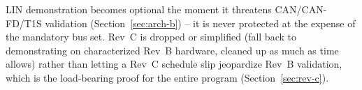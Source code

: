 \begin{decision}[title={LIN and Rev C are explicitly conditional}]
LIN demonstration becomes optional the moment it threatens CAN/CAN-FD/T1S validation (Section~\ref{sec:arch-b}) -- it is never protected at the expense of the mandatory bus set. Rev~C is dropped or simplified (fall back to demonstrating on characterized Rev~B hardware, cleaned up as much as time allows) rather than letting a Rev~C schedule slip jeopardize Rev~B validation, which is the load-bearing proof for the entire program (Section~\ref{sec:rev-c}).
\end{decision}
